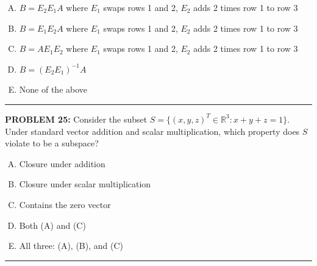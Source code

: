 \documentclass[12pt]{amsart}
\newcommand{\divider}{
  \vspace{-1em} %
  \noindent
  \raisebox{-0.15ex}{\textbullet}%
  \hspace{0.5em}%
  \rule[0.5ex]{0.95\textwidth}{1.0pt}%
  \hspace{0.5em}%
  \raisebox{-0.15ex}{\textbullet}%
  \vspace{0em} %
}
\begin{document}
\begin{enumerate}[(A)]
\item $B = E_2 E_1 A$ where $E_1$ swaps rows 1 and 2, $E_2$ adds 2 times row 1 to row 3
\item $B = E_1 E_2 A$ where $E_1$ swaps rows 1 and 2, $E_2$ adds 2 times row 1 to row 3
\item $B = A E_1 E_2$ where $E_1$ swaps rows 1 and 2, $E_2$ adds 2 times row 1 to row 3
\item $B = (E_2 E_1)^{-1} A$
\item None of the above
\end{enumerate}
\divider



{\bf PROBLEM 25:}
Consider the subset $S = \{(x, y, z)^T \in \mathbb{R}^3 : x + y + z = 1\}$. Under standard vector addition and scalar multiplication, which property does $S$ violate to be a subspace?

\begin{enumerate}[(A)]
\item Closure under addition 
\item Closure under scalar multiplication 
\item Contains the zero vector 
\item Both (A) and (C)
\item All three: (A), (B), and (C)
\end{enumerate}
\divider
\end{document}
